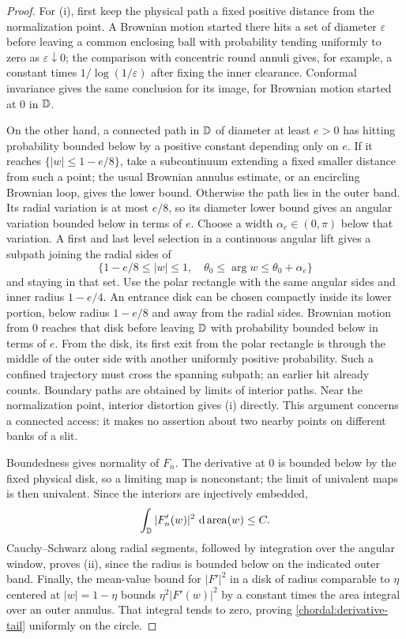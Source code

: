 \begin{proof}
For (i), first keep the physical path a fixed positive distance from
the normalization point.  A Brownian motion started there hits a
set of diameter $\varepsilon$ before leaving a common enclosing ball
with probability tending uniformly to zero as $\varepsilon\downarrow0$;
the comparison with concentric round annuli gives, for example, a
constant times $1/\log(1/\varepsilon)$ after fixing the inner
clearance.  Conformal invariance gives the same conclusion for its
image, for Brownian motion started at $0$ in $\mathbb D$.

On the other hand, a connected path in $\mathbb D$ of diameter at least
$e>0$ has hitting probability bounded below by a positive constant
depending only on $e$.  If it reaches $\{|w|\le1-e/8\}$, take a
subcontinuum extending a fixed smaller distance from such a point;
the usual Brownian annulus estimate, or an encircling Brownian loop,
gives the lower bound.  Otherwise the path lies in the outer band.
Its radial variation is at most $e/8$, so its diameter lower bound
gives an angular variation bounded below in terms of $e$.  Choose a
width $\alpha_e\in(0,\pi)$ below that variation.  A first and last
level selection in a continuous angular lift gives a subpath joining
the radial sides of
\[
 \{1-e/8\le |w|\le1,\quad \theta_0\le\arg w\le\theta_0+\alpha_e\}
\]
and staying in that set.  Use the polar rectangle with the same
angular sides and inner radius $1-e/4$.  An entrance disk can be
chosen compactly inside its lower portion, below radius $1-e/8$ and
away from the radial sides.  Brownian motion from $0$ reaches that
disk before leaving $\mathbb D$ with probability bounded below in terms of
$e$.  From the disk, its first exit from the polar rectangle is
through the middle of the outer side with another uniformly positive
probability.  Such a confined trajectory must cross the spanning
subpath; an earlier hit already counts.  Boundary paths are obtained
by limits of interior paths.
Near the normalization point, interior distortion gives (i) directly.
This argument concerns a connected access: it makes no assertion
about two nearby points on different banks of a slit.

Boundedness gives normality of $F_n$.  The derivative at $0$ is
bounded below by the fixed physical disk, so a limiting map is
nonconstant; the limit of univalent maps is then univalent.  Since
the interiors are injectively embedded,
\[
 \int_{\mathbb D}|F_n'(w)|^2\,\,\mathrm d\operatorname{area}(w)\le C.
\]
Cauchy--Schwarz along radial segments, followed by integration over
the angular window, proves (ii), since the radius is bounded below
on the indicated outer band.  Finally, the mean-value bound for
$|F'|^2$ in a disk of radius comparable to $\eta$ centered at
$|w|=1-\eta$ bounds $\eta^2|F'(w)|^2$ by a constant times the area
integral over an outer annulus.  That integral tends to zero, proving
\eqref{chordal:derivative-tail} uniformly on the circle.
\end{proof}

